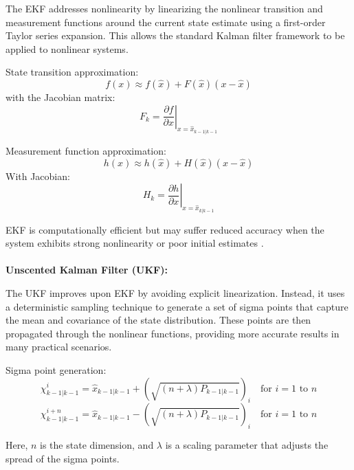 The EKF addresses nonlinearity by linearizing the nonlinear transition and measurement functions around the current state estimate using a first-order Taylor series expansion. This allows the standard Kalman filter framework to be applied to nonlinear systems.

State transition approximation:
\begin{equation}
    f(x) \approx f(\hat{x}) + F(\hat{x})(x - \hat{x})
\end{equation}
with the Jacobian matrix:
\begin{equation}
    F_k = \left. \frac{\partial f}{\partial x} \right|_{x = \hat{x}_{k-1|k-1}}
\end{equation}

Measurement function approximation:
\begin{equation}
    h(x) \approx h(\hat{x}) + H(\hat{x})(x - \hat{x})
\end{equation}
With Jacobian:
\begin{equation}
    H_k = \left. \frac{\partial h}{\partial x} \right|_{x = \hat{x}_{k|k-1}}
\end{equation}

EKF is computationally efficient but may suffer reduced accuracy when the system exhibits strong nonlinearity or poor initial estimates \cite{Rusnak18}.
\\
\\
\textbf{Unscented Kalman Filter (UKF):}

The UKF improves upon EKF by avoiding explicit linearization. Instead, it uses a deterministic sampling technique to generate a set of sigma points that capture the mean and covariance of the state distribution. These points are then propagated through the nonlinear functions, providing more accurate results in many practical scenarios.

Sigma point generation:
\begin{equation}
    \chi_{k-1|k-1}^i = \hat{x}_{k-1|k-1} + \left( \sqrt{(n + \lambda) P_{k-1|k-1}} \right)_i \quad \text{for } i = 1 \text{ to } n
\end{equation}
\begin{equation}
    \chi_{k-1|k-1}^{i+n} = \hat{x}_{k-1|k-1} - \left( \sqrt{(n + \lambda) P_{k-1|k-1}} \right)_i \quad \text{for } i = 1 \text{ to } n
\end{equation}

Here, $n$ is the state dimension, and $\lambda$ is a scaling parameter that adjusts the spread of the sigma points.

